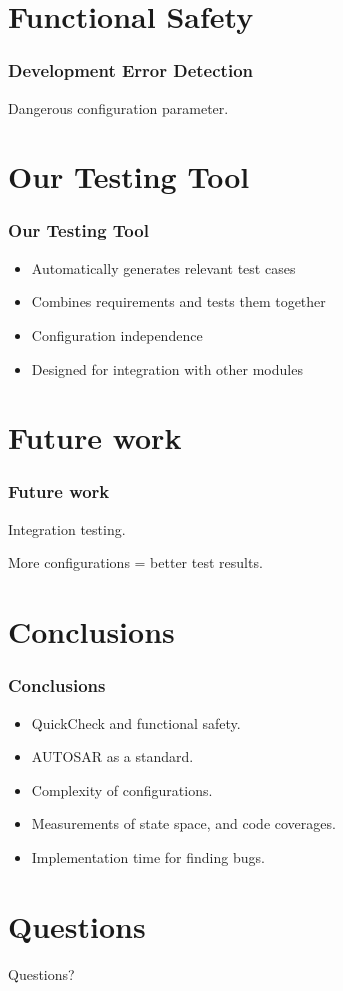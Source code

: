 \documentclass{beamer}
\begin{document}
\section{Functional Safety}
\begin{frame}[fragile]
  \frametitle{Development Error Detection}
  Dangerous configuration parameter.
\end{frame}

\section{Our Testing Tool}
\begin{frame}
  \frametitle{Our Testing Tool}
  \begin{itemize}
        \item Automatically generates relevant test cases
        \item Combines requirements and tests them together
        \item Configuration independence
        \item Designed for integration with other modules
  \end{itemize}
  \end{frame}


\section{Future work}
\begin{frame}[fragile]
  \frametitle{Future work}
  Integration testing.

  More configurations = better test results.
\end{frame}

\section{Conclusions}
\begin{frame}
  \frametitle{Conclusions}
  \begin{itemize}
    \item QuickCheck and functional safety.
    \item AUTOSAR as a standard.
    \item Complexity of configurations.
    \item Measurements of state space, and code coverages.
    \item Implementation time for finding bugs.
  \end{itemize}
\end{frame}

\section{Questions}
\begin{frame}
  \Huge{\centerline{Questions?}}
\end{frame}
\end{document}
